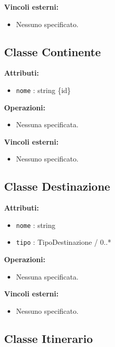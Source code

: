 \documentclass[a4paper]{scrartcl}
\begin{document}
\textbf{Vincoli esterni:}
\begin{itemize}
    \item Nessuno specificato.
\end{itemize}

\subsection{Classe Continente}

\textbf{Attributi:}
\begin{itemize}
    \item \texttt{nome} : string \{id\}
\end{itemize}

\textbf{Operazioni:}
\begin{itemize}
    \item Nessuna specificata.
\end{itemize}

\textbf{Vincoli esterni:}
\begin{itemize}
    \item Nessuno specificato.
\end{itemize}

\subsection{Classe Destinazione}

\textbf{Attributi:}
\begin{itemize}
    \item \texttt{nome} : string
    \item \texttt{tipo} : TipoDestinazione / 0..*
\end{itemize}

\textbf{Operazioni:}
\begin{itemize}
    \item Nessuna specificata.
\end{itemize}

\textbf{Vincoli esterni:}
\begin{itemize}
    \item Nessuno specificato.
\end{itemize}

\subsection{Classe Itinerario}
\end{document}
